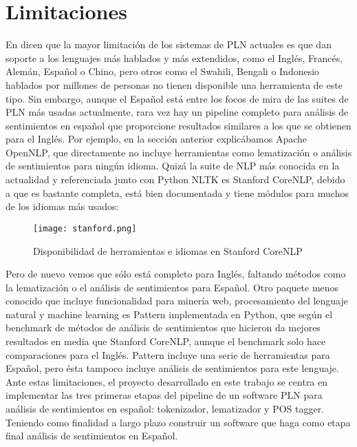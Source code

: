 \section{Limitaciones}
En \citet{hirschberg2015advances} dicen que la mayor limitación de los sistemas de PLN actuales es que dan soporte a los lenguajes más hablados y más extendidos, como el Inglés, Francés, Alemán, Español o Chino, pero otros como el Swahili, Bengali o Indonesio hablados por millones de personas no tienen disponible una herramienta de este tipo. \newline
Sin embargo, aunque el Español está entre los focos de mira de las suites de PLN más usadas actualmente, rara vez hay un pipeline completo para análisis de sentimientos en español que proporcione resultados similares a los que se obtienen para el Inglés. Por ejemplo, en la sección anterior explicábamos \textcolor{SchoolColor}{Apache OpenNLP}, que directamente no incluye herramientas como lematización o análisis de sentimientos para ningún idioma.\newline
Quizá la suite de NLP más conocida en la actualidad y referenciada junto con \textcolor{SchoolColor}{Python NLTK} es \textcolor{SchoolColor}{Stanford CoreNLP}, debido a que es bastante completa, está bien documentada y tiene módulos para muchos de los idiomas más usados:
\begin{figure}[H]%
\centering
\texttt{[image: stanford.png]}  %
\label{}
\caption{Disponibilidad de herramientas e idiomas en Stanford CoreNLP}   
\end{figure}
Pero de nuevo vemos que sólo está completo para Inglés, faltando métodos como la lematización o el análisis de sentimientos para Español. Otro paquete menos conocido que incluye funcionalidad para minería web, procesamiento del lenguaje natural y machine learning es  \textcolor{SchoolColor}{Pattern} \citet{smedt2012pattern}  implementada en Python, que según el benchmark de métodos de análisis de sentimientos que hicieron \citet{ribeiro2016sentibench} da mejores resultados en media que Stanford CoreNLP, aunque el benchmark solo hace comparaciones para el Inglés. \newline
\textcolor{SchoolColor}{Pattern} incluye una serie de herramientas para Español, pero ésta tampoco incluye análisis de sentimientos para este lenguaje. \newline
Ante estas limitaciones, el proyecto desarrollado en este trabajo se centra en implementar las tres primeras etapas  del pipeline de un software PLN para análisis de sentimientos en español: tokenizador, lematizador y POS tagger.\newline
Teniendo como finalidad a largo plazo construir un software que haga como etapa final análisis de sentimientos en Español. 